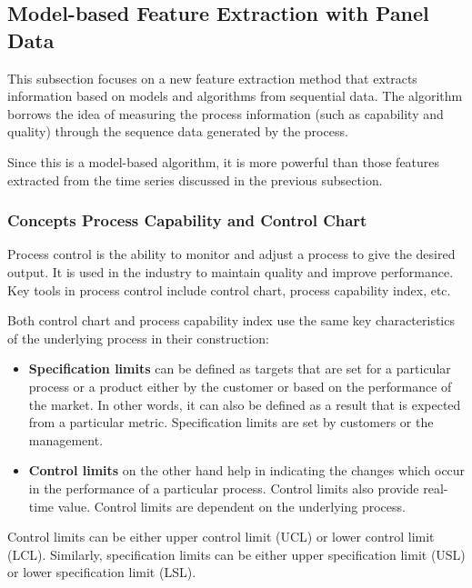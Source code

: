 \documentclass[
]{article}
\begin{document}
\hypertarget{model-based-feature-extraction-with-panel-data}{%
\subsection{Model-based Feature Extraction with Panel
Data}\label{model-based-feature-extraction-with-panel-data}}

This subsection focuses on a new feature extraction method that extracts
information based on models and algorithms from sequential data. The
algorithm borrows the idea of measuring the process information (such as
capability and quality) through the sequence data generated by the
process.

Since this is a model-based algorithm, it is more powerful than those
features extracted from the time series discussed in the previous
subsection.

\hypertarget{concepts-process-capability-and-control-chart}{%
\subsubsection{Concepts Process Capability and Control
Chart}\label{concepts-process-capability-and-control-chart}}

Process control is the ability to monitor and adjust a process to give
the desired output. It is used in the industry to maintain quality and
improve performance. Key tools in process control include control chart,
process capability index, etc.

Both control chart and process capability index use the same key
characteristics of the underlying process in their construction:

\begin{itemize}
\item
  \textbf{Specification limits} can be defined as targets that are set
  for a particular process or a product either by the customer or based
  on the performance of the market. In other words, it can also be
  defined as a result that is expected from a particular metric.
  Specification limits are set by customers or the management.
\item
  \textbf{Control limits} on the other hand help in indicating the
  changes which occur in the performance of a particular process.
  Control limits also provide real-time value. Control limits are
  dependent on the underlying process.
\end{itemize}

Control limits can be either upper control limit (UCL) or lower control
limit (LCL). Similarly, specification limits can be either upper
specification limit (USL) or lower specification limit (LSL).
\end{document}
